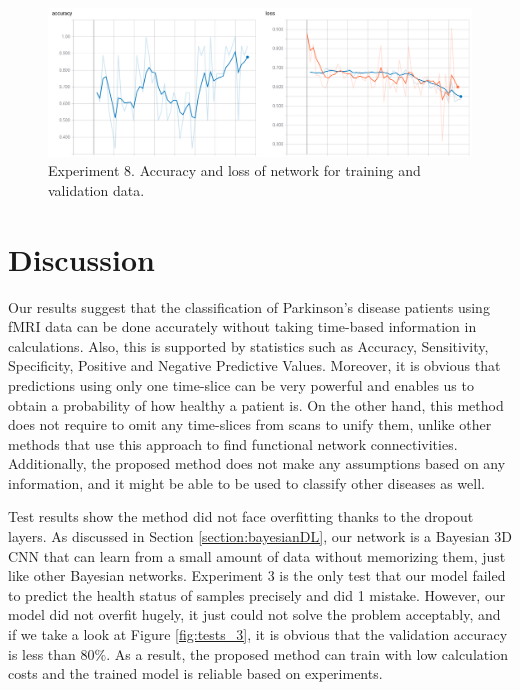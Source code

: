 \documentclass[a4paper,fleqn]{cas-dc}
\begin{document}
\begin{figure}
\includegraphics[width=\linewidth]{images/tests_8}
\caption{Experiment 8. Accuracy and loss of network for training and validation data.}
\label{fig:tests_8}
\end{figure}













\section{Discussion}
\label{section:discussion}

Our results suggest that the classification of Parkinson’s disease patients using fMRI data can be done accurately without taking time-based information in calculations. Also, this is supported by statistics such as Accuracy, Sensitivity, Specificity, Positive and Negative Predictive Values. Moreover, it is obvious that predictions using only one time-slice can be very powerful and enables us to obtain a probability of how healthy a patient is. On the other hand, this method does not require to omit any time-slices from scans to unify them, unlike other methods that use this approach to find functional network connectivities. Additionally, the proposed method does not make any assumptions based on any information, and it might be able to be used to classify other diseases as well.

Test results show the method did not face overfitting thanks to the dropout layers. As discussed in Section \ref{section:bayesianDL}, our network is a Bayesian 3D CNN that can learn from a small amount of data without memorizing them, just like other Bayesian networks. Experiment 3 is the only test that our model failed to predict the health status of samples precisely and did 1 mistake. However, our model did not overfit hugely, it just could not solve the problem acceptably, and if we take a look at Figure \ref{fig:tests_3}, it is obvious that the validation accuracy is less than $80\%$. As a result, the proposed method can train with low calculation costs and the trained model is reliable based on experiments.
\end{document}

